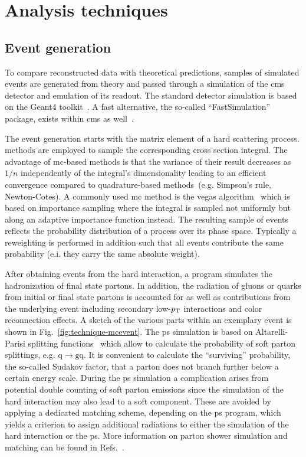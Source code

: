 \chapter{Analysis techniques}


\section{Event generation}

To compare reconstructed data with theoretical predictions, samples of simulated events are generated from theory and passed through a simulation of the \gls{cms} detector and emulation of its readout. The standard detector simulation is based on the Geant4 toolkit~\cite{Agostinelli2003250}. A fast alternative, the so-called ``FastSimulation'' package, exists within \gls{cms} as well~\cite{fsimRahmat}.

The event generation starts with the matrix element of a hard scattering process.  methods are employed to sample the corresponding cross section integral. The advantage of \gls{mc}-based methods is that the variance of their result decreases as $1/n$ independently of the integral's dimensionality leading to an efficient convergence compared to quadrature-based methods~(e.g. Simpson's rule, Newton-Cotes). A commonly used \gls{mc} method is the \gls{vegas} algorithm~\cite{OHL199913} which is based on importance sampling where the integral is sampled not uniformly but along an adaptive importance function instead. The resulting sample of events reflects the probability distribution of a process over its phase space. Typically a reweighting is performed in addition such that all events contribute the same probability (e.i. they carry the same absolute weight). 

After obtaining events from the hard interaction, a  program simulates the hadronization of final state partons. In addition, the radiation of gluons or quarks from initial or final state partons is accounted for as well as contributions from the underlying event including secondary low-$p_\mathrm{T}$ interactions and color reconnection effects. A sketch of the various parts within an exemplary event is shown in Fig.~\ref{fig:technique-mcevent}. The \gls{ps} simulation is based on Altarelli-Parisi splitting functions~\cite{Altarelli:1977zs} which allow to calculate the probability of soft parton splittings, e.g. $\mathrm{q}\to \mathrm{gq}$. It is convenient to calculate the ``surviving'' probability, the so-called Sudakov factor, that a parton does not branch further below a certain energy scale. During the \gls{ps} simulation a complication arises from potential double counting of soft parton emissions since the simulation of the hard interaction may also lead to a soft component. These are avoided by applying a dedicated matching scheme, depending on the \gls{ps} program, which yields a criterion to assign additional radiations to either the simulation of the hard interaction or the \gls{ps}. More information on parton shower simulation and matching can be found in Refs.~\cite{Hoche:2014rga,Hoche:2006ph}.


